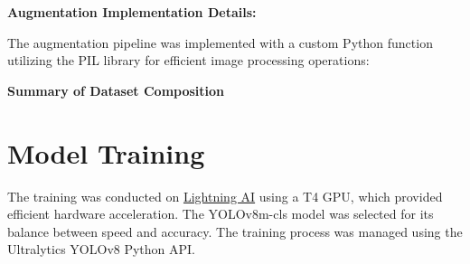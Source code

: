 \documentclass[a4paper,12pt]{report}
\begin{document}
\begin{spacing}{1.5}
    \textbf{Augmentation Implementation Details:}
    
    The augmentation pipeline was implemented with a custom Python function utilizing the PIL library for efficient image processing operations:
    
    \newpage
    
    
    \textbf{Summary of Dataset Composition}
    
    \begin{table}[H]
    \caption{Distribution of Images Across Dataset Subsets}
    \centering
    \end{table}

    \newpage
    \section{Model Training}
    The training was conducted on \href{https://lightning.ai/}{Lightning AI} using a T4 GPU, which provided efficient hardware acceleration. The YOLOv8m-cls model was selected for its balance between speed and accuracy. The training process was managed using the Ultralytics YOLOv8 Python API.
    

\end{spacing}
\end{document}
